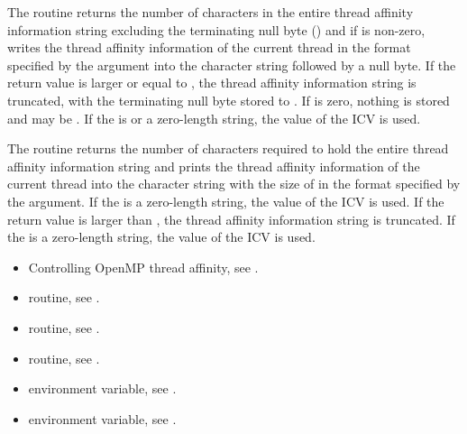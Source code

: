 \effect
\begin{ccppspecific}
The  routine returns the number of characters
in the entire thread affinity information string excluding the terminating
null byte () and if  is non-zero, writes the thread
affinity information of the current thread  in the format specified by 
the  argument into the character string  followed 
by a null byte.  If the return value is larger or equal to , the 
thread affinity information string is truncated, with the terminating
null byte stored to {}.  If  is
zero, nothing is stored and  may be . If the 
 is  or a zero-length string, the value of the
 ICV is used.
\end{ccppspecific}

\begin{fortranspecific}
The  routine returns the number of characters
required to hold the entire thread affinity information string and prints 
the thread affinity information of the current thread into the character 
string  with the size of {} in the 
format specified by the  argument. If the  is a 
zero-length string, the value of the  ICV is used. 
If the return value is larger than {}, the thread 
affinity information string is truncated. If the  is a zero-length 
string, the value of the  ICV is used.
\end{fortranspecific}

\crossreferences
\begin{itemize}
\item Controlling OpenMP thread affinity, see
.

\item {} routine, 
see .

\item {} routine, 
see .

\item {} routine, see .

\item {} environment variable, see
.

\item {} environment variable, see
.
\end{itemize}



